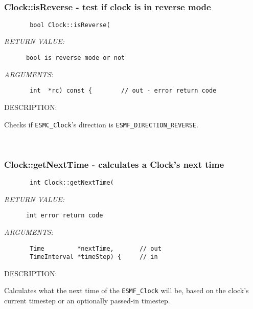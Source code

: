  
\mbox{}\hrulefill\ 
 
\subsubsection [Clock::isReverse] {Clock::isReverse - test if clock is in reverse mode}


  
\begin{verbatim}       bool Clock::isReverse(\end{verbatim}{\em RETURN VALUE:}
\begin{verbatim}      bool is reverse mode or not\end{verbatim}{\em ARGUMENTS:}
\begin{verbatim}       int  *rc) const {        // out - error return code\end{verbatim}
{\sf DESCRIPTION:\\ }


      Checks if {\tt ESMC\_Clock}'s direction is {\tt ESMF\_DIRECTION\_REVERSE}.
   
 
\mbox{}\hrulefill\ 
 
\subsubsection [Clock::getNextTime] {Clock::getNextTime - calculates a Clock's next time }


  
\begin{verbatim}       int Clock::getNextTime(\end{verbatim}{\em RETURN VALUE:}
\begin{verbatim}      int error return code\end{verbatim}{\em ARGUMENTS:}
\begin{verbatim}       Time         *nextTime,       // out
       TimeInterval *timeStep) {     // in
 \end{verbatim}
{\sf DESCRIPTION:\\ }


        Calculates what the next time of the {\tt ESMF\_Clock} will be, based
        on the clock's current timestep or an optionally passed-in timestep.
 
   
 

